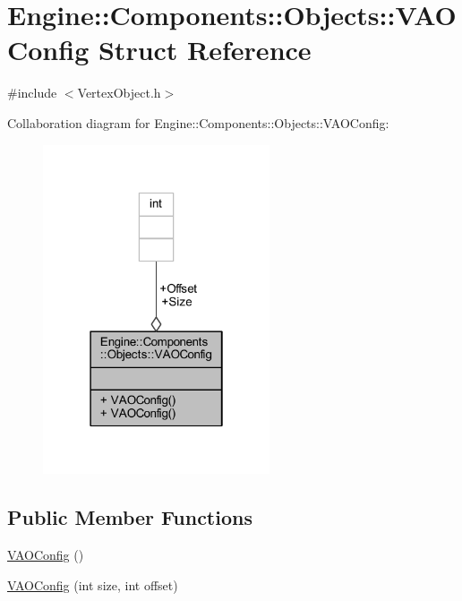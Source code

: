 \hypertarget{structEngine_1_1Components_1_1Objects_1_1VAOConfig}{}\section{Engine\+:\+:Components\+:\+:Objects\+:\+:V\+A\+O\+Config Struct Reference}
\label{structEngine_1_1Components_1_1Objects_1_1VAOConfig}


{\ttfamily \#include $<$Vertex\+Object.\+h$>$}



Collaboration diagram for Engine\+:\+:Components\+:\+:Objects\+:\+:V\+A\+O\+Config\+:
\nopagebreak
\begin{figure}[H]
\begin{center}
\leavevmode
\includegraphics[width=190pt]{structEngine_1_1Components_1_1Objects_1_1VAOConfig__coll__graph}
\end{center}
\end{figure}
\subsection*{Public Member Functions}
\begin{DoxyCompactItemize}
\item 
\mbox{\hyperlink{structEngine_1_1Components_1_1Objects_1_1VAOConfig_af0fc55d3a998fd288ef8d5ddb2c808c8}{V\+A\+O\+Config}} ()
\item 
\mbox{\hyperlink{structEngine_1_1Components_1_1Objects_1_1VAOConfig_a6861c27437102022a1108036ddf30062}{V\+A\+O\+Config}} (int size, int offset)
\end{DoxyCompactItemize}
